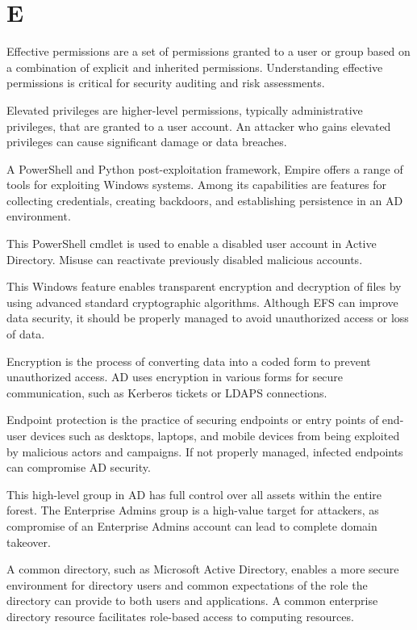 \section*{E}
 Effective permissions are a set of permissions granted to a user or group based on a combination of explicit and inherited permissions. Understanding effective permissions is critical for security auditing and risk assessments.

 Elevated privileges are higher-level permissions, typically administrative privileges, that are granted to a user account. An attacker who gains elevated privileges can cause significant damage or data breaches.

 A PowerShell and Python post-exploitation framework, Empire offers a range of tools for exploiting Windows systems. Among its capabilities are features for collecting credentials, creating backdoors, and establishing persistence in an AD environment.

 This PowerShell cmdlet is used to enable a disabled user account in Active Directory. Misuse can reactivate previously disabled malicious accounts.

 This Windows feature enables transparent encryption and decryption of files by using advanced standard cryptographic algorithms. Although EFS can improve data security, it should be properly managed to avoid unauthorized access or loss of data.

 Encryption is the process of converting data into a coded form to prevent unauthorized access. AD uses encryption in various forms for secure communication, such as Kerberos tickets or LDAPS connections.

 Endpoint protection is the practice of securing endpoints or entry points of end-user devices such as desktops, laptops, and mobile devices from being exploited by malicious actors and campaigns. If not properly managed, infected endpoints can compromise AD security.

 This high-level group in AD has full control over all assets within the entire forest. The Enterprise Admins group is a high-value target for attackers, as compromise of an Enterprise Admins account can lead to complete domain takeover.

 A common directory, such as Microsoft Active Directory, enables a more secure environment for directory users and common expectations of the role the directory can provide to both users and applications. A common enterprise directory resource facilitates role-based access to computing resources.

